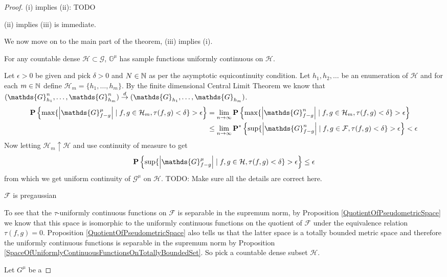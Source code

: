 \begin{proof}
(i) implies (ii): TODO

(ii) implies (iii) is immediate.

We now move on to the main part of the theorem, (iii) implies (i).  

\begin{clm} For any countable dense $\mathcal{H} \subset \mathcal{G}$, $\mathds{G}^\mu$ has sample functions uniformly continuous on $\mathcal{H}$.
\end{clm}
Let $\epsilon > 0$ be given and pick $\delta > 0$ and $N \in \mathbb{N}$ as per the asymptotic equicontinuity condition.  Let $h_1, h_2, \dotsc$ be an enumeration of $\mathcal{H}$ and for each $m \in \mathbb{N}$ define $\mathcal{H}_m = \lbrace h_1, \dotsc, h_m \rbrace$.  By the finite dimensional Central Limit Theorem we know that $(\mathds{G}^n_{h_1}, \dotsc, \mathds{G}^n_{h_m}) \todist (\mathds{G}_{h_1}, \dotsc, \mathds{G}_{h_m})$.
\begin{align*}
\probability{\max \lbrace \abs{\mathds{G}^\mu_{f-g}} \mid f,g \in \mathcal{H}_m, \tau(f,g) < \delta \rbrace > \epsilon} 
&=\lim_{n \to \infty} \probability{\max \lbrace \abs{\mathds{G}^n_{f-g}} \mid f,g \in \mathcal{H}_m, \tau(f,g) < \delta \rbrace > \epsilon} \\
&\leq \lim_{n \to \infty} \oprobability{\sup \lbrace \abs{\mathds{G}^n_{f-g}} \mid f,g \in \mathcal{F}, \tau(f,g) < \delta \rbrace > \epsilon} < \epsilon
\end{align*}
Now letting $\mathcal{H}_m \uparrow \mathcal{H}$ and use continuity of measure to get
\begin{align*}
\probability{\sup \lbrace \abs{\mathds{G}^\mu_{f-g}} \mid f,g \in \mathcal{H}, \tau(f,g) < \delta \rbrace > \epsilon}  \leq \epsilon
\end{align*}
from which we get uniform continuity of $\mathcal{G}^\mu$ on $\mathcal{H}$.  TODO: Make sure all the details are correct here.

\begin{clm} $\mathcal{F}$ is pregaussian
\end{clm}
To see that the $\tau$-uniformly continuous functions on $\mathcal{F}$ is separable in the supremum norm, by Proposition \ref{QuotientOfPseudometricSpace} we know that this space is isomorphic to the uniformly continuous functions on the quotient of $\mathcal{F}$ under the equivalence relation $\tau(f,g) = 0$.  Proposition \ref{QuotientOfPseudometricSpace}  also tells us that the latter space is a totally bounded metric space and therefore the uniformly continuous functions is separable in the supremum norm by Proposition \ref{SpaceOfUniformlyContinuousFunctionsOnTotallyBoundedSet}.  So pick a countable dense subset $\mathcal{H}$.  

Let $G^\mu$ be a 

\end{proof}

